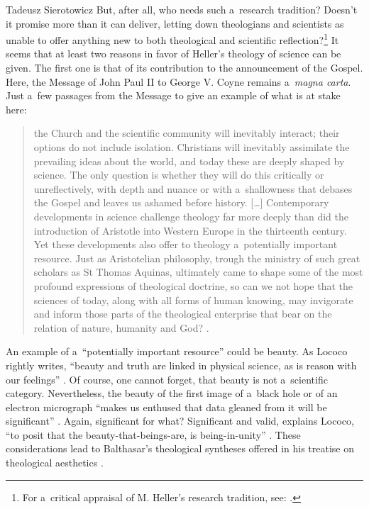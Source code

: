 \begin{artengenv}{Tadeusz Sierotowicz}
But, after all, who needs such a~research tradition? Doesn't it promise more than it can deliver, letting down theologians and scientists as unable to offer anything new to both theological and scientific reflection?\footnote{For a~critical appraisal of M. Heller's research tradition, see: 
\parencite[][]{polak_teologia_2016}.%
} It seems that at least two reasons in favor of Heller's theology of science can be given. The first one is that of its contribution to the announcement of the Gospel. Here, the Message of John Paul II to George V. Coyne remains a~\textit{magna carta}. Just a~few passages from the Message to give an example of what is at stake here:



\begin{quote}
the Church and the scientific community will inevitably interact; their options do not include isolation. Christians will inevitably assimilate the prevailing ideas about the world, and today these are deeply shaped by science. The only question is whether they will do this critically or unreflectively, with depth and nuance or with a~shallowness that debases the Gospel and leaves us ashamed before history. […] Contemporary developments in science challenge theology far more deeply than did the introduction of Aristotle into Western Europe in the thirteenth century. Yet these developments also offer to theology a~potentially important resource. Just as Aristotelian philosophy, trough the ministry of such great scholars as St Thomas Aquinas, ultimately came to shape some of the most profound expressions of theological doctrine, so can we not hope that the sciences of today, along with all forms of human knowing, may invigorate and inform those parts of the theological enterprise that bear on the relation of nature, humanity and God? 
\parencite[][]{john_paul_ii_letter_1988}.%
\end{quote}




An example of a~``potentially important resource'' could be beauty. As Lococo rightly writes, ``beauty and truth are linked in physical science, as is reason with our feelings'' 
\parencite[][p.61]{lococo_life_2021}. %
 Of course, one cannot forget, that beauty is not a~scientific category. Nevertheless, the beauty of the first image of a~black hole 
\parencite[][]{szybka_remarks_2020} %
 or of an electron micrograph ``makes us enthused that data gleaned from it will be significant'' 
\parencite[][p.61]{lococo_life_2021}. %
 Again, significant for what? Significant and valid, explains Lococo, ``to posit that the beauty-that-beings-are, is being-in-unity'' 
\parencite[][p.62]{lococo_life_2021}. %
 These considerations lead to Balthasar's theological syntheses offered in his treatise on theological aesthetics 
\parencite[][]{balthasar_glory_2009}.%





\end{artengenv}
